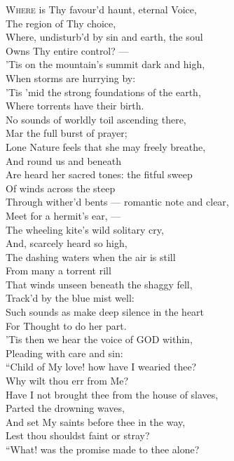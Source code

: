 \textsc{Where} is Thy favour’d haunt, eternal Voice, \\
 The region of Thy choice, \\
 Where, undisturb’d by sin and earth, the soul \\
 Owns Thy entire control? — \\
 ’Tis on the mountain’s summit dark and high, \\
 When storms are hurrying by: \\
 ’Tis ’mid the strong foundations of the earth, \\
 Where torrents have their birth. \\
  No sounds of worldly toil ascending there, \\
 Mar the full burst of prayer; \\
 Lone Nature feels that she may freely breathe, \\
 And round us and beneath \\
 Are heard her sacred tones: the fitful sweep \\
 Of winds across the steep \\
 Through wither’d bents — romantic note and clear, \\
 Meet for a hermit’s ear, — \\
  The wheeling kite’s wild solitary cry, \\
 And, scarcely heard so high, \\
 The dashing waters when the air is still \\
 From many a torrent rill \\
 That winds unseen beneath the shaggy fell, \\
 Track’d by the blue mist well: \\
 Such sounds as make deep silence in the heart \\
 For Thought to do her part. \\
  ’Tis then we hear the voice of GOD within, \\
 Pleading with care and sin: \\
 “Child of My love! how have I wearied thee? \\
 Why wilt thou err from Me? \\
 Have I not brought thee from the house of slaves, \\
 Parted the drowning waves, \\
 And set My saints before thee in the way, \\
 Lest thou shouldst faint or stray? \\
  “What! was the promise made to thee alone? \\
